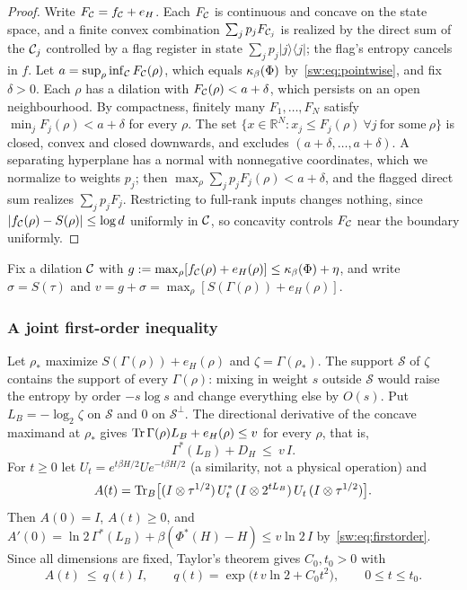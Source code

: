 \begin{proof}
Write $F_{\mathcal C}=f_{\mathcal C}+e_H$. Each $F_{\mathcal C}$ is continuous and concave on the state space, and a finite convex combination $\sum_jp_jF_{\mathcal C_j}$ is realized by the direct sum of the $\mathcal C_j$ controlled by a flag register in state $\sum_jp_j|j\rangle\langle j|$; the flag's entropy cancels in $f$. Let $a=\sup_\rho\inf_{\mathcal C}F_{\mathcal C}(\rho)$, which equals $\kappa_\beta(\Phi)$ by~\eqref{sw:eq:pointwise}, and fix $\delta>0$. Each $\rho$ has a dilation with $F_{\mathcal C}(\rho)<a+\delta$, which persists on an open neighbourhood. By compactness, finitely many $F_1,\dots,F_N$ satisfy $\min_jF_j(\rho)<a+\delta$ for every $\rho$. The set $\{x\in\mathbb R^N:x_j\le F_j(\rho)\ \forall j\ \text{for some}\ \rho\}$ is closed, convex and closed downwards, and excludes $(a+\delta,\dots,a+\delta)$. A separating hyperplane has a normal with nonnegative coordinates, which we normalize to weights $p_j$; then $\max_\rho\sum_jp_jF_j(\rho)<a+\delta$, and the flagged direct sum realizes $\sum_jp_jF_j$. Restricting to full-rank inputs changes nothing, since $|f_{\mathcal C}(\rho)-S(\rho)|\le\log d$ uniformly in $\mathcal C$, so concavity controls $F_{\mathcal C}$ near the boundary uniformly.
\end{proof}

Fix a dilation $\mathcal C$ with $g:=\max_\rho[f_{\mathcal C}(\rho)+e_H(\rho)]\le\kappa_\beta(\Phi)+\eta$, and write $\sigma=S(\tau)$ and $v=g+\sigma=\max_\rho[S(\Gamma(\rho))+e_H(\rho)]$.

\subsubsection{A joint first-order inequality}

Let $\rho_*$ maximize $S(\Gamma(\rho))+e_H(\rho)$ and $\zeta=\Gamma(\rho_*)$. The support $\mathcal S$ of $\zeta$ contains the support of every $\Gamma(\rho)$: mixing in weight $s$ outside $\mathcal S$ would raise the entropy by order $-s\log s$ and change everything else by $O(s)$. Put $L_B=-\log_2\zeta$ on $\mathcal S$ and $0$ on $\mathcal S^\perp$. The directional derivative of the concave maximand at $\rho_*$ gives $\operatorname{Tr}\Gamma(\rho)L_B+e_H(\rho)\le v$ for every $\rho$, that is,
\begin{equation}\label{sw:eq:firstorder}
\Gamma^*(L_B)+D_H\ \le\ v\,I.
\end{equation}
For $t\ge0$ let $U_t=e^{t\beta H/2}Ue^{-t\beta H/2}$ (a similarity, not a physical operation) and
\[
A(t)=\operatorname{Tr}_B\bigl[(I\otimes\tau^{1/2})\,U_t^*\,(I\otimes2^{tL_B})\,U_t\,(I\otimes\tau^{1/2})\bigr].
\]
Then $A(0)=I$, $A(t)\ge0$, and $A'(0)=\ln2\,\Gamma^*(L_B)+\beta(\Phi^*(H)-H)\le v\ln2\,I$ by~\eqref{sw:eq:firstorder}. Since all dimensions are fixed, Taylor's theorem gives $C_0,t_0>0$ with
\begin{equation}\label{sw:eq:qt}
A(t)\ \le\ q(t)\,I,\qquad q(t)=\exp\bigl(t\,v\ln2+C_0t^2\bigr),\qquad0\le t\le t_0.
\end{equation}

